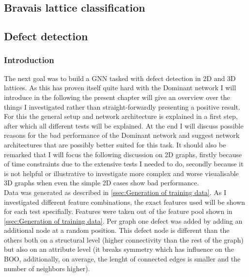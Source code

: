 \documentclass[11pt,a4paper]{article}
\begin{document}
\subsection{Bravais lattice classification}
\label{ssec:Bravais lattice classification}

\subsection{Defect detection}
\label{ssec:Defect detection}
\subsubsection{Introduction}
The next goal was to build a GNN tasked with defect detection in 2D and 3D lattices. 
As this has proven itself quite hard with the Dominant network I will introduce in the following the present chapter will give an overview over the things I investigated rather than straight-forwardly presenting a positive result. 
For this the general setup and network architecture is explained in a first step, after which all different tests will be explained. 
At the end I will discuss possible reasons for the bad performance of the Dominant network and suggest network architectures that are possibly better suited for this task. 
It should also be remarked that I will focus the following discussion on 2D graphs, firstly because of time constraints due to the extensive tests I needed to do, secondly because it is not helpful or illustrative to investigate more complex and worse visualisable 3D graphs when even the simple 2D cases show bad performance. \\

Data was generated as described in \autoref{ssec:Generation of training data}. 
As I investigated different feature combinations, the exact features used will be shown for each test specifially. 
Features were taken out of the feature pool shown in \autoref{ssec:Generation of training data}. 
Per graph one defect was added by adding an additional node at a random position. 
This defect node is different than the others both on a structural level (higher connectivity than the rest of the graph) but also on an attribute level (it breaks symmetry which has influence on the BOO, additionally, on average, the lenght of connected edges is smaller and the number of neighbors higher). \\
\end{document}
